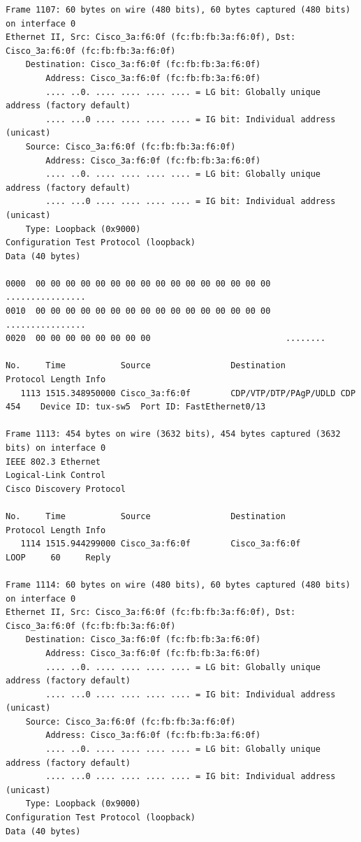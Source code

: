 \documentclass[a4paper,11pt]{article}
\begin{document}
\begin{lstlisting}
Frame 1107: 60 bytes on wire (480 bits), 60 bytes captured (480 bits) on interface 0
Ethernet II, Src: Cisco_3a:f6:0f (fc:fb:fb:3a:f6:0f), Dst: Cisco_3a:f6:0f (fc:fb:fb:3a:f6:0f)
    Destination: Cisco_3a:f6:0f (fc:fb:fb:3a:f6:0f)
        Address: Cisco_3a:f6:0f (fc:fb:fb:3a:f6:0f)
        .... ..0. .... .... .... .... = LG bit: Globally unique address (factory default)
        .... ...0 .... .... .... .... = IG bit: Individual address (unicast)
    Source: Cisco_3a:f6:0f (fc:fb:fb:3a:f6:0f)
        Address: Cisco_3a:f6:0f (fc:fb:fb:3a:f6:0f)
        .... ..0. .... .... .... .... = LG bit: Globally unique address (factory default)
        .... ...0 .... .... .... .... = IG bit: Individual address (unicast)
    Type: Loopback (0x9000)
Configuration Test Protocol (loopback)
Data (40 bytes)

0000  00 00 00 00 00 00 00 00 00 00 00 00 00 00 00 00   ................
0010  00 00 00 00 00 00 00 00 00 00 00 00 00 00 00 00   ................
0020  00 00 00 00 00 00 00 00                           ........

No.     Time           Source                Destination           Protocol Length Info
   1113 1515.348950000 Cisco_3a:f6:0f        CDP/VTP/DTP/PAgP/UDLD CDP      454    Device ID: tux-sw5  Port ID: FastEthernet0/13  

Frame 1113: 454 bytes on wire (3632 bits), 454 bytes captured (3632 bits) on interface 0
IEEE 802.3 Ethernet 
Logical-Link Control
Cisco Discovery Protocol

No.     Time           Source                Destination           Protocol Length Info
   1114 1515.944299000 Cisco_3a:f6:0f        Cisco_3a:f6:0f        LOOP     60     Reply

Frame 1114: 60 bytes on wire (480 bits), 60 bytes captured (480 bits) on interface 0
Ethernet II, Src: Cisco_3a:f6:0f (fc:fb:fb:3a:f6:0f), Dst: Cisco_3a:f6:0f (fc:fb:fb:3a:f6:0f)
    Destination: Cisco_3a:f6:0f (fc:fb:fb:3a:f6:0f)
        Address: Cisco_3a:f6:0f (fc:fb:fb:3a:f6:0f)
        .... ..0. .... .... .... .... = LG bit: Globally unique address (factory default)
        .... ...0 .... .... .... .... = IG bit: Individual address (unicast)
    Source: Cisco_3a:f6:0f (fc:fb:fb:3a:f6:0f)
        Address: Cisco_3a:f6:0f (fc:fb:fb:3a:f6:0f)
        .... ..0. .... .... .... .... = LG bit: Globally unique address (factory default)
        .... ...0 .... .... .... .... = IG bit: Individual address (unicast)
    Type: Loopback (0x9000)
Configuration Test Protocol (loopback)
Data (40 bytes)


\end{lstlisting}
\end{document}
